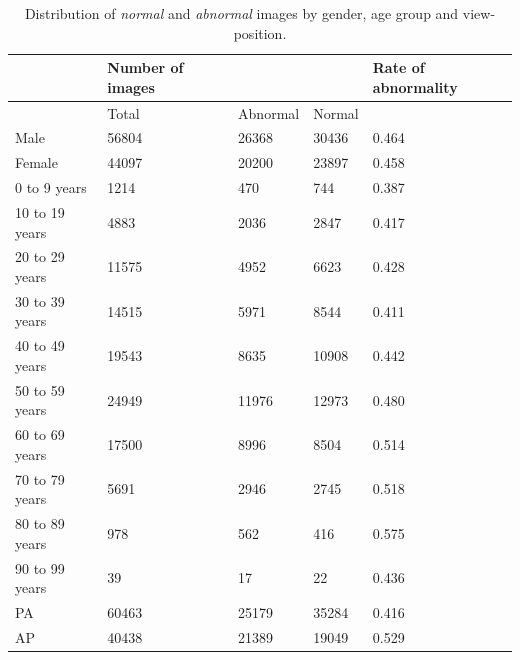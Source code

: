 \documentclass[12pt,oneside,a4paper]{report}
\begin{document}
\begin{table}[]
  \centering
  \begin{tabular}{@{}lllll@{}}
    \toprule
               & \textbf{Number of images} &          &        & \textbf{Rate of abnormality}                    \\ \midrule
               & Total            & Abnormal & Normal & \\ \midrule
Male           & 56804            & 26368    & 30436  & 0.464               \\
Female         & 44097            & 20200    & 23897  & 0.458               \\ \midrule
0 to 9 years   & 1214             & 470      & 744    & 0.387               \\
10 to 19 years & 4883             & 2036     & 2847   & 0.417               \\
20 to 29 years & 11575            & 4952     & 6623   & 0.428               \\
30 to 39 years & 14515            & 5971     & 8544   & 0.411               \\
40 to 49 years & 19543            & 8635     & 10908  & 0.442               \\
50 to 59 years & 24949            & 11976    & 12973  & 0.480               \\
60 to 69 years & 17500            & 8996     & 8504   & 0.514               \\
70 to 79 years & 5691             & 2946     & 2745   & 0.518               \\
80 to 89 years & 978              & 562      & 416    & 0.575               \\
90 to 99 years & 39               & 17       & 22     & 0.436               \\ \midrule
PA             & 60463            & 25179    & 35284  & 0.416               \\
AP             & 40438            & 21389    & 19049  & 0.529               \\
\bottomrule
\end{tabular}
\caption{Distribution of \emph{normal} and \emph{abnormal} images by gender, age group and view-position.}
\label{tab:distribution_overall}
\end{table}
\end{document}
